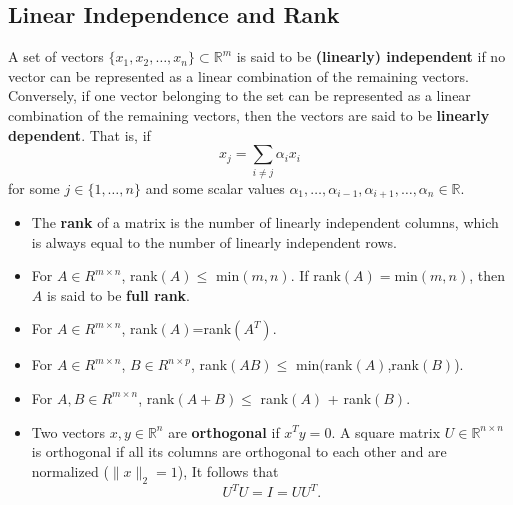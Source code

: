 \subsection{Linear Independence and Rank}
A set of vectors $\{x_{1},x_{2},\ldots,x_{n}\} \subset \mathbb{R}^{m}$ is said to be {\bf (linearly) independent} if no vector can be represented as a linear combination of the remaining vectors. Conversely, if one vector belonging to the set can be represented as a linear combination of the remaining vectors, then the vectors are said to be {\bf linearly dependent}. That is, if 
\begin{equation*}
x_{j}=\sum\limits_{i\neq j}\alpha_{i}x_{i}
\end{equation*}
for some $j \in \{1,\ldots,n\}$ and some scalar values $\alpha_{1}, \ldots, \alpha_{i-1}, \alpha_{i+1}, \ldots, \alpha_{n} \in \mathbb{R}$. 

\begin{itemize}
\item The {\bf rank} of a matrix is the number of linearly independent columns, which is always equal to the number of linearly independent rows.
\item For $A \in R^{m\times n}$, rank$(A) \leq$ min$(m,n)$. If rank$(A)=$min$(m,n)$, then $A$ is said
to be  {\bf full rank}.
\item For $A \in R^{m\times n}$, rank$(A)$=rank$(A^{T})$.
\item For $A \in R^{m\times n}$,  $B \in R^{n\times p}$, rank$(AB) \leq$ min$($rank$(A)$,rank$(B)$).
\item For $A,B \in R^{m\times n}$, rank$(A+B) \leq$ rank$(A)$ + rank$(B)$.
\item Two vectors $x,y \in \mathbb{R}^{n}$ are {\bf orthogonal} if $x^{T}y=0$. A square matrix $U \in \mathbb{R}^{n\times n}$ is orthogonal if all its columns are orthogonal to each other and are normalized ($\|x\|_{2} = 1$), It follows that
\begin{equation*}
U^{T}U=I=UU^{T}.
\end{equation*}
\end{itemize}



